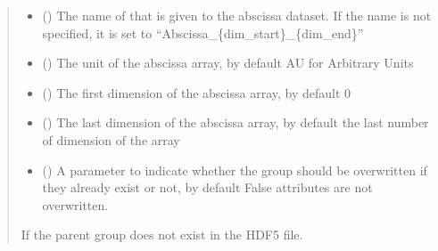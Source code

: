 \documentclass[letterpaper,10pt,english]{sphinxmanual}
\begin{document}
\begin{fulllineitems}
\begin{fulllineitems}
\begin{quote}
\begin{description}
\begin{itemize}
\item {} 
\sphinxAtStartPar
{} (\sphinxstyleliteralemphasis{\sphinxupquote{, }}) \textendash{} The name of that is given to the abscissa dataset. If the name is not specified, it is set to “Abscissa\_\{dim\_start\}\_\{dim\_end\}”

\item {} 
\sphinxAtStartPar
{} (\sphinxstyleliteralemphasis{\sphinxupquote{, }}) \textendash{} The unit of the abscissa array, by default AU for Arbitrary Units

\item {} 
\sphinxAtStartPar
{} (\sphinxstyleliteralemphasis{\sphinxupquote{, }}) \textendash{} The first dimension of the abscissa array, by default 0

\item {} 
\sphinxAtStartPar
{} (\sphinxstyleliteralemphasis{\sphinxupquote{, }}) \textendash{} The last dimension of the abscissa array, by default the last number of dimension of the array

\item {} 
\sphinxAtStartPar
{} (\sphinxstyleliteralemphasis{\sphinxupquote{, }}) \textendash{} A parameter to indicate whether the group should be overwritten if they already exist or not, by default False \sphinxhyphen{} attributes are not overwritten.

\end{itemize}

\sphinxAtStartPar
{\hyperref[\detokenize{source/_autosummary/HDF5_BLS.errors:HDF5_BLS.errors.WrapperError_StructureError}]{}} \textendash{} If the parent group does not exist in the HDF5 file.

\end{description}\end{quote}


\end{fulllineitems}
\end{fulllineitems}
\end{document}
